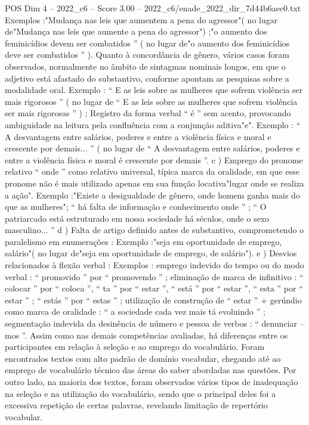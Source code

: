 \begin{textsample}{POS Dim 4 – 2022\_c6 – Score 3.00 – 2022\_c6/enade\_2022\_dir\_7d44b6aec0.txt}
Exemplos :"Mudança nas leis que aumentem a pena do agressor"( no lugar de"Mudança nas leis que aumente a pena do agressor") ;"o aumento dos feminicídios devem ser combatidos ” ( no lugar de"o aumento dos feminicídios deve ser combatidos ” ).
Quanto à concordância de gênero, vários casos foram observados, normalmente no âmbito de sintagmas nominais longos, em que o adjetivo está afastado do substantivo, conforme apontam as pesquisas sobre a modalidade oral.
Exemplo : “ E as leis sobre as mulheres que sofrem violência ser mais rigorosos ” ( no lugar de “ E as leis sobre as mulheres que sofrem violência ser mais rigorosas ” ) ; Registro da forma verbal “ é ” sem acento, provocando ambiguidade na leitura pela confluência com a conjunção aditiva"e".
Exemplo : “ A desvantagem entre salários, poderes e entre a violência física e moral e crescente por demais... ” ( no lugar de “ A desvantagem entre salários, poderes e entre a violência física e moral é crescente por demais ”. c ) Emprego do pronome relativo “ onde ” como relativo universal, típica marca da oralidade, em que esse pronome não é mais utilizado apenas em sua função locativa"lugar onde se realiza a ação".
Exemplo :"Existe a desigualdade de gênero, onde homem ganha mais do que as mulheres"; “ há falta de informação e conhecimento onde ” ; “ O patriarcado está estruturado em nossa sociedade há séculos, onde o sexo masculino... ” d ) Falta de artigo definido antes de substantivo, comprometendo o paralelismo em enumerações : Exemplo :"seja em oportunidade de emprego, salário"( no lugar de"seja em oportunidade de emprego, de salário"). e ) Desvios relacionados à flexão verbal : Exemplos : emprego indevido do tempo ou do modo verbal : “ promovido ” por “ promovendo ” ; eliminação de marca de infinitivo : “ colocar ” por “ coloca ”, “ ta ” por “ estar ”, “ está ” por “ estar ”, “ esta ” por “ estar ” ; “ estás ” por “ estas ” ; utilização de construção de “ estar ” + gerúndio como marca de oralidade : “ a sociedade cada vez mais tá evoluindo ” ; segmentação indevida da desinência de número e pessoa de verbos : “ denunciar – mos ”.
Assim como nas demais competências avaliadas, há diferenças entre os participantes em relação à seleção e ao emprego do vocabulário.
Foram encontrados textos com alto padrão de domínio vocabular, chegando até ao emprego de vocabulário técnico das áreas do saber abordadas nas questões.
Por outro lado, na maioria dos textos, foram observados vários tipos de inadequação na seleção e na utilização do vocabulário, sendo que o principal deles foi a excessiva repetição de certas palavras, revelando limitação de repertório vocabular.

\end{textsample}
